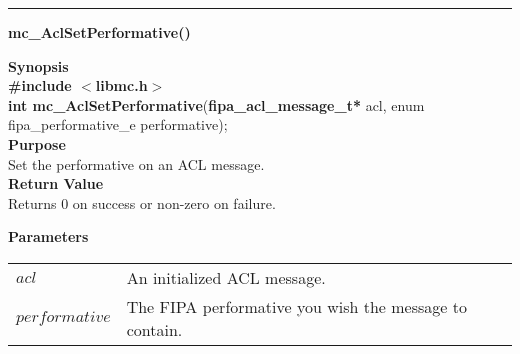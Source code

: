 \noindent
\vspace{5pt}
\rule{6.5in}{0.015in}
\noindent
{}
{\LARGE \bf mc\_AclSetPerformative()}\\
\label{api:mc_AclSetPerformative()}

\noindent
{\bf Synopsis}\\
{\bf \#include $<$libmc.h$>$}\\
{\bf int mc\_AclSetPerformative}({\bf fipa\_acl\_message\_t*} acl, enum fipa\_performative\_e performative);\\

\noindent
{\bf Purpose}\\
Set the performative on an ACL message.\\

\noindent
{\bf Return Value}\\
Returns 0 on success or non-zero on failure.

\noindent
{\bf Parameters}
\vspace{-0.1in}
\begin{description}
\item
\begin{tabular}{p{10 mm}p{145 mm}} 
$acl$ & An initialized ACL message. \\
$performative$ & The FIPA performative you wish the message to contain.
\end{tabular}
\end{description}

